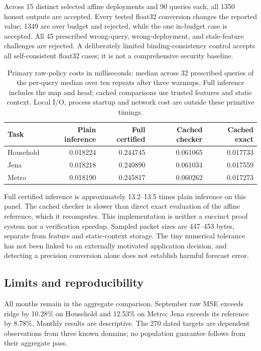 Across 15 distinct selected affine deployments and 90 queries each, all 1350 honest outputs are accepted. Every tested float32 conversion changes the reported value; 1349 are over budget and rejected, while the one in-budget case is accepted. All 45 prescribed wrong-query, wrong-deployment, and stale-feature challenges are rejected. A deliberately limited binding-consistency control accepts all self-consistent float32 cases; it is not a comprehensive security baseline.

\begin{table}[htbp]
\centering\small
\begin{tabular}{@{}lrrrr@{}}
\toprule
Task & Plain inference & Full certified & Cached checker & Cached exact\\
\midrule
Household & 0.018224 & 0.244745 & 0.061065 & 0.017733\\
Jena & 0.018218 & 0.240890 & 0.061034 & 0.017559\\
Metro & 0.018190 & 0.245817 & 0.060262 & 0.017273\\
\bottomrule
\end{tabular}
\caption{Primary raw-policy costs in milliseconds: median across 32 prescribed queries of the per-query median over ten repeats after three warmups. Full inference includes the map and head; cached comparisons use trusted features and static context. Local I/O, process startup and network cost are outside these primitive timings.}
\label{tab:cost}
\end{table}

Full certified inference is approximately 13.2--13.5 times plain inference on this panel. The cached checker is slower than direct exact evaluation of the affine reference, which it recomputes. This implementation is neither a succinct proof system nor a verification speedup. Sampled packet sizes are 447--453 bytes, separate from feature and static-context storage. The tiny numerical tolerance has not been linked to an externally motivated application decision, and detecting a precision conversion alone does not establish harmful forecast error.

\subsection{Limits and reproducibility}
All months remain in the aggregate comparison. September raw MSE exceeds ridge by 10.28\% on Household and 12.53\% on Metro; Jena exceeds its reference by 8.78\%. Monthly results are descriptive. The 270 dated targets are dependent observations from three known domains; no population guarantee follows from their aggregate pass.

